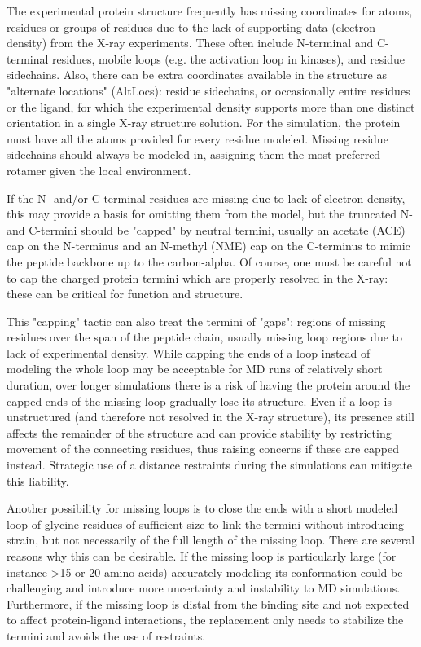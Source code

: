\documentclass[9pt,bestpractices,pubversion]{livecoms}
\begin{document}
The experimental protein structure frequently has missing coordinates for atoms, residues or groups of residues due to the lack of supporting data (electron density) from the X-ray experiments. These often include N-terminal and C-terminal residues, mobile loops (e.g. the activation loop in kinases), and residue sidechains. Also, there can be extra coordinates available in the structure as "alternate locations" (AltLocs): residue sidechains, or occasionally entire residues or the ligand, for which the experimental density supports more than one distinct orientation in a single X-ray structure solution. For the simulation, the protein must have all the atoms provided for every residue modeled. Missing residue sidechains should always be modeled in, assigning them the most preferred rotamer given the local environment. 

If the N- and/or C-terminal residues are missing due to lack of electron density, this may provide a basis for omitting them from the model, but the truncated N- and C-termini should be "capped" by neutral termini, usually an acetate (ACE) cap on the N-terminus and an N-methyl (NME) cap on the C-terminus to mimic the peptide backbone up to the carbon-alpha. Of course, one must be careful not to cap the charged protein termini which are properly resolved in the X-ray: these can be critical for function and structure. 

This "capping" tactic can also treat the termini of "gaps": regions of missing residues over the span of the peptide chain, usually missing loop regions due to lack of experimental density. While capping the ends of a loop instead of modeling the whole loop may be acceptable for MD runs of relatively short duration, over longer simulations there is a risk of having the protein around the capped ends of the missing loop gradually lose its structure. Even if a loop is unstructured (and therefore not resolved in the X-ray structure), its presence still affects the remainder of the structure and can provide stability by restricting movement of the connecting residues, thus raising concerns if these are capped instead. Strategic use of a distance restraints during the simulations can mitigate this liability.

Another possibility for missing loops is to close the ends with a short modeled loop of glycine residues of sufficient size to link the termini without introducing strain, but not necessarily of the full length of the missing loop. There are several reasons why this can be desirable. If the missing loop is particularly large (for instance >15 or 20 amino acids) accurately modeling its conformation could be challenging and introduce more uncertainty and instability to MD simulations. Furthermore, if the missing loop is distal from the binding site and not expected to affect protein-ligand interactions, the replacement only needs to stabilize the termini and avoids the use of restraints. 
\end{document}

